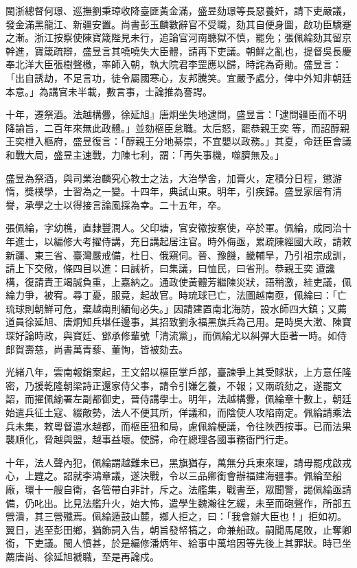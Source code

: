 \begin{pinyinscope}
閩浙總督何璟、巡撫劉秉璋收降臺匪黃金滿，盛昱劾璟等長惡養奸，請下吏嚴議，發金滿黑龍江、新疆安置。尚書彭玉麟數辭官不受職，劾其自便身圖，啟功臣驕蹇之漸。浙江按察使陳寶箴陛見未行，追論官河南聽獄不慎，罷免；張佩綸劾其留京幹進，寶箴疏辯，盛昱言其嘵嘵失大臣體，請再下吏議。朝鮮之亂也，提督吳長慶奉北洋大臣張樹聲檄，率師入朝，執大院君李罡應以歸，時詫為奇勛。盛昱言：「出自誘劫，不足言功，徒令屬國寒心，友邦騰笑。宜嚴予處分，俾中外知非朝廷本意。」為講官未半載，數言事，士論推為謇諤。

十年，遷祭酒。法越構釁，徐延旭』唐炯坐失地逮問，盛昱言：「逮問疆臣而不明降諭旨，二百年來無此政體。」並劾樞臣怠職。太后怒，罷恭親王奕等，而詔醇親王奕枻入樞府，盛昱復言：「醇親王分地綦崇，不宜嬰以政務。」其夏，命廷臣會議和戰大局，盛昱主速戰，力陳七利，謂：「再失事機，噬臍無及。」

盛昱為祭酒，與司業治麟究心教士之法，大治學舍，加膏火，定積分日程，懲游惰，獎樸學，士習為之一變。十四年，典試山東。明年，引疾歸。盛昱家居有清譽，承學之士以得接言論風採為幸。二十五年，卒。

張佩綸，字幼樵，直隸豐潤人。父印塘，官安徽按察使，卒於軍。佩綸，成同治十年進士，以編修大考擢侍講，充日講起居注官。時外侮亟，累疏陳經國大政，請敕新疆、東三省、臺灣嚴戒備，杜日、俄窺伺。晉、豫饑，畿輔旱，乃引祖宗成訓，請上下交儆，條四目以進：曰誠祈，曰集議，曰恤民，曰省刑。恭親王奕遭讒構，復請責王竭誠負重，上嘉納之。通政使黃體芳繼陳災狀，語稍激，絓吏議，佩綸力爭，被宥。尋丁憂，服竟，起故官。時琉球已亡，法圖越南亟，佩綸曰：「亡琉球則朝鮮可危，棄越南則緬甸必失。」因請建置南北海防，設水師四大鎮；又薦道員徐延旭、唐炯知兵堪任邊事，其招致劉永福黑旗兵為己用。是時吳大澂、陳寶琛好論時政，與寶廷、鄧承修輩號「清流黨」，而佩綸尤以糾彈大臣著一時。如侍郎賀壽慈，尚書萬青藜、董恂，皆被劾去。

光緒八年，雲南報銷案起，王文韶以樞臣掌戶部，臺諫爭上其受賕狀，上方意任隆密，乃援乾隆朝梁詩正還家侍父事，請令引嫌乞養，不報；又兩疏劾之，遂罷文韶，而擢佩緰署左副都御史，晉侍講學士。明年，法越構釁，佩綸章十數上，朝廷始遣兵征土寇、綴敵勢，法人不便其所，佯議和，而陰使人攻陷南定。佩綸請乘法兵未集，敕粵督遣水越都，而樞臣狃和局，慮佩綸梗議，令往陜西按事。已而法果襲順化，脅越與盟，越事益壞。使歸，命在總理各國事務衙門行走。

十年，法人聲內犯，佩綸謂越難未已，黑旗猶存，萬無分兵東來理，請毋罷戍啟戎心，上韙之。詔就李鴻章議，遂決戰，令以三品卿銜會辦福建海疆事。佩綸至船廠，環十一艘自衛，各管帶白非計，斥之。法艦集，戰書至，眾聞警，謁佩綸亟請備，仍叱出。比見法艦升火，始大怖，遣學生魏瀚往乞緩，未至而砲聲作，所部五營潰，其三營殲焉。佩綸遁鼓山麓，鄉人拒之，曰：「我會辦大臣也！」拒如初。翼日，逃至彭田鄉，猶飾詞入告，朝旨發帑犒之，命兼船政。嗣聞馬尾敗，止奪卿銜，下吏議。閩人憤甚，於是編修潘炳年、給事中萬培因等先後上其罪狀。時已坐薦唐尚、徐延旭褫職，至是再論戍。


\end{pinyinscope}
